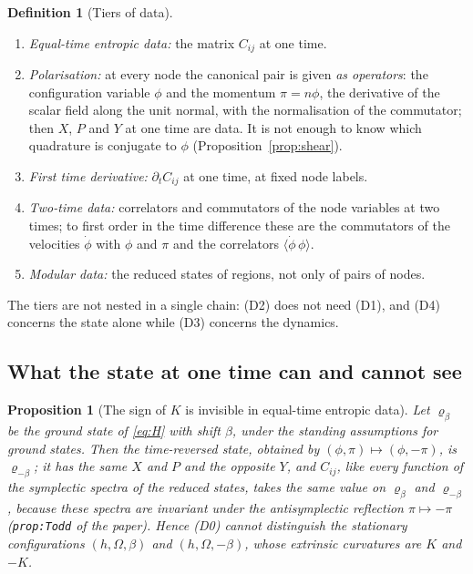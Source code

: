 \documentclass[a4paper,11pt]{article}
\newtheorem{proposition}[theorem]{Proposition}
\theoremstyle{definition}
\newtheorem{definition}[theorem]{Definition}
\theoremstyle{remark}
\begin{document}
\begin{definition}[Tiers of data]\label{def:tiers}
\begin{enumerate}[label=\textup{(D\arabic*)},start=0]
\item \emph{Equal-time entropic data:} the matrix $C_{ij}$ at one time.
\item \emph{Polarisation:} at every node the canonical pair is given \emph{as operators}: the configuration variable $\phi$ and the momentum $\pi=n\phi$, the derivative of the scalar field along the unit normal, with the normalisation of the commutator; then $X$, $P$ and $Y$ at one time are data. It is not enough to know which quadrature is conjugate to $\phi$ (Proposition~\ref{prop:shear}).
\item \emph{First time derivative:} $\partial_tC_{ij}$ at one time, at fixed node labels.
\item \emph{Two-time data:} correlators and commutators of the node variables at two times; to first order in the time difference these are the commutators of the velocities $\dot\phi$ with $\phi$ and $\pi$ and the correlators $\langle\dot\phi\,\phi\rangle$.
\item \emph{Modular data:} the reduced states of regions, not only of pairs of nodes.
\end{enumerate}
\end{definition}

The tiers are not nested in a single chain: (D2) does not need (D1), and (D4) concerns the state alone while (D3) concerns the dynamics.

\subsection{What the state at one time can and cannot see}

\begin{proposition}[The sign of $K$ is invisible in equal-time entropic data]\label{prop:sign}
Let $\varrho_\beta$ be the ground state of \eqref{eq:H} with shift $\beta$, under the standing assumptions for ground states. Then the time-reversed state, obtained by $(\phi,\pi)\mapsto(\phi,-\pi)$, is $\varrho_{-\beta}$; it has the same $X$ and $P$ and the opposite $Y$, and $C_{ij}$, like every function of the symplectic spectra of the reduced states, takes the same value on $\varrho_\beta$ and $\varrho_{-\beta}$, because these spectra are invariant under the antisymplectic reflection $\pi\mapsto-\pi$ (\texttt{prop:Todd} of the paper). Hence \textup{(D0)} cannot distinguish the stationary configurations $(h,\Omega,\beta)$ and $(h,\Omega,-\beta)$, whose extrinsic curvatures are $K$ and $-K$.
\end{proposition}
\end{document}
